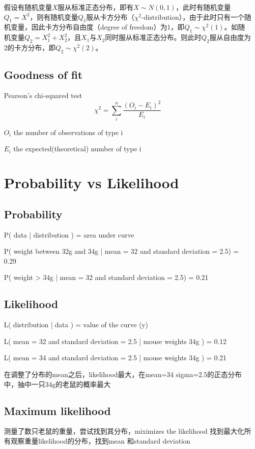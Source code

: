 \documentclass[11pt]{article}
\begin{document}
假设有随机变量$X$服从标准正态分布，即有$X \sim N(0,1)$，此时有随机变量$Q_1=X^2$，则有随机变量$Q_1$服从卡方分布（$\chi^2\text{-distribution}$），由于此时只有一个随机变量，因此卡方分布自由度（degree of freedom）为1，即$Q_1 \sim \chi^2(1)$。如随机变量$Q_2 = X_1^2 + X_2^2$，且$X_1$与$X_2$同时服从标准正态分布。则此时$Q_2$服从自由度为2的卡方分布，即$Q_2 \sim \chi^2(2)$。


\subsection*{Goodness of fit}

Pearson's chi-squared test
\begin{equation*}
    \chi^2 = \sum_i^n \frac{(O_i - E_i)^2}{E_i}
\end{equation*}

\begin{list}{-}{}
    \item $O_i$ the number of observations of type i
    \item $E_i$ the expected(theoretical) number of type i
\end{list}

\section{Probability vs Likelihood}

\subsection{Probability}

P( data | distribution ) = area under curve

P( weight between 32g and 34g | mean = 32 and standard deviation = 2.5) = 0.29

P( weight > 34g | mean = 32 and standard deviation = 2.5) = 0.21

\subsection{Likelihood}

L( distribution | data ) = value of the curve (y)

L( mean = 32 and standard deviation = 2.5 | mouse weights 34g ) = 0.12

L( mean = 34 and standard deviation = 2.5 | mouse weights 34g ) = 0.21

在调整了分布的mean之后，likelihood最大，在mean=34 sigma=2.5的正态分布中，抽中一只34g的老鼠的概率最大

\subsection{Maximum likelihood}

测量了数只老鼠的重量，尝试找到其分布，miximizes the likelihood 找到最大化所有观察重量likelihood的分布，找到mean 和standard deviation
\end{document}
